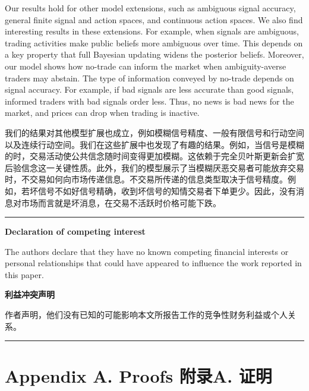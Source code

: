 \documentclass[12pt,a4paper]{article}
\newenvironment{original}{%
  \par\vspace{4pt}\noindent%
  \color{black}%
  \ignorespaces
}{%
  \par\vspace{2pt}%
}
\newenvironment{translation}{%
  \par\vspace{2pt}\noindent%
  \color{transblue}%
  \ignorespaces
}{%
  \par\vspace{4pt}\hrule\vspace{6pt}%
}
\begin{document}
\begin{original}
Our results hold for other model extensions, such as ambiguous signal accuracy, general finite signal and action spaces, and continuous action spaces. We also find interesting results in these extensions. For example, when signals are ambiguous, trading activities make public beliefs more ambiguous over time. This depends on a key property that full Bayesian updating widens the posterior beliefs. Moreover, our model shows how no-trade can inform the market when ambiguity-averse traders may abstain. The type of information conveyed by no-trade depends on signal accuracy. For example, if bad signals are less accurate than good signals, informed traders with bad signals order less. Thus, no news is bad news for the market, and prices can drop when trading is inactive.
\end{original}
\begin{translation}
我们的结果对其他模型扩展也成立，例如模糊信号精度、一般有限信号和行动空间以及连续行动空间。我们在这些扩展中也发现了有趣的结果。例如，当信号是模糊的时，交易活动使公共信念随时间变得更加模糊。这依赖于完全贝叶斯更新会扩宽后验信念这一关键性质。此外，我们的模型展示了当模糊厌恶交易者可能放弃交易时，不交易如何向市场传递信息。不交易所传递的信息类型取决于信号精度。例如，若坏信号不如好信号精确，收到坏信号的知情交易者下单更少。因此，没有消息对市场而言就是坏消息，在交易不活跃时价格可能下跌。
\end{translation}

\begin{original}
\noindent\textbf{Declaration of competing interest}

The authors declare that they have no known competing financial interests or personal relationships that could have appeared to influence the work reported in this paper.
\end{original}
\begin{translation}
\textbf{利益冲突声明}

作者声明，他们没有已知的可能影响本文所报告工作的竞争性财务利益或个人关系。
\end{translation}

\newpage

\section*{Appendix A. Proofs \hfill 附录A. 证明}
\end{document}
